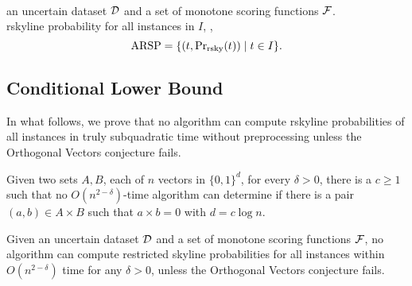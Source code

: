 \\
 an uncertain dataset $\mathcal{D}$ and a set of monotone scoring functions $\mathcal{F}$. \\
 rskyline probability for all instances in $I$, \ie,
\[{\rm ARSP} = \{(t, {\rm Pr}_{\rm rsky}(t)) \mid t \in I\}.\]


\subsection{Conditional Lower Bound}

In what follows, we prove that no algorithm can compute rskyline probabilities of all instances in truly subquadratic time without preprocessing unless the Orthogonal Vectors conjecture fails.

 Given two sets $A, B$, each of $n$ vectors in $\{0, 1\}^d$, for every $\delta > 0$, there is a $c \ge 1$ such that no $O(n^{2 - \delta})$-time algorithm can determine if there is a pair $(a, b) \in A\times B$ such that $a \times b = 0$ with $d = c\log{n}$.


\begin{theorem}\label{thm:lower-bound}
	Given an uncertain dataset $\mathcal{D}$ and a set of monotone scoring functions $\mathcal{F}$, no algorithm can compute restricted skyline probabilities for all instances within $O(n^{2-\delta})$ time for any $\delta > 0$, unless the Orthogonal Vectors conjecture fails.
\end{theorem}

